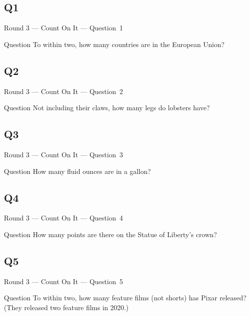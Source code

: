 \documentclass[11pt]{beamer}
\begin{document}
\subsection*{Q1}
\begin{frame}[t]{Round 3 --- Count On It --- \mbox{Question 1}}
\vspace{-0.5em}
\begin{block}{Question}
To within two, how many countries are in the European Union?
\end{block}
\end{frame}
\subsection*{Q2}
\begin{frame}[t]{Round 3 --- Count On It --- \mbox{Question 2}}
\vspace{-0.5em}
\begin{block}{Question}
Not including their claws, how many legs do lobsters have?
\end{block}
\end{frame}
\subsection*{Q3}
\begin{frame}[t]{Round 3 --- Count On It --- \mbox{Question 3}}
\vspace{-0.5em}
\begin{block}{Question}
How many fluid ounces are in a gallon?
\end{block}
\end{frame}
\subsection*{Q4}
\begin{frame}[t]{Round 3 --- Count On It --- \mbox{Question 4}}
\vspace{-0.5em}
\begin{block}{Question}
How many points are there on the Statue of Liberty's crown?
\end{block}
\end{frame}
\subsection*{Q5}
\begin{frame}[t]{Round 3 --- Count On It --- \mbox{Question 5}}
\vspace{-0.5em}
\begin{block}{Question}
To within two, how many feature films (not shorts) has Pixar released? (They released two feature films in 2020.)
\end{block}
\end{frame}
\end{document}
